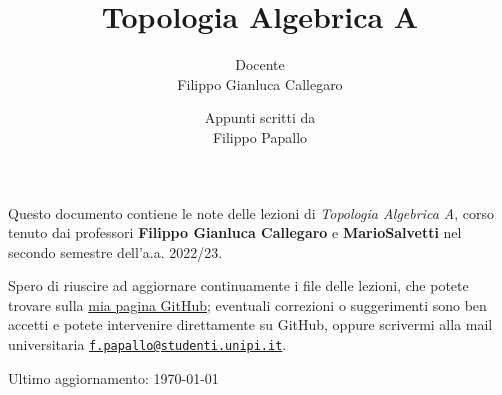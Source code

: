 \documentclass[a4paper, 10pt, oneside, DIV=9, chapterprefix=true, numbers=enddot,bibliography=totoc]{scrbook}
\title{Topologia Algebrica A}
\author{{\normalsize Docente}\\
	Filippo Gianluca Callegaro}
\date{{\normalsize Appunti scritti da}\\
	Filippo Papallo}
\begin{document}
\setlength{\parindent}{0pt}
\setlength{\parskip}{4pt}

\frontmatter
{}
\renewcommand{\thedummy}{\arabic{dummy}}
\maketitle
Questo documento contiene le note delle lezioni di \emph{Topologia Algebrica A},
corso tenuto dai professori \textbf{Filippo Gianluca Callegaro} e
\textbf{MarioSalvetti} nel secondo semestre
dell'a.a. 2022/23. 

Spero di riuscire ad aggiornare continuamente
i file delle lezioni, che potete trovare sulla 
\href{https://github.com/le-pap/Topologia-Algebrica-A}{mia pagina GitHub};
eventuali correzioni o suggerimenti sono ben accetti e potete intervenire direttamente
su GitHub, oppure scrivermi alla mail universitaria 
\href{mailto:f.papallo@studenti.unipi.it}{\texttt{f.papallo@studenti.unipi.it}}.

\hrulefill

Ultimo aggiornamento: \today
	
	
	
\tableofcontents
{}
\setcounter{llecture}{0}
\mainmatter{}
\renewcommand{\thedummy}{\thechapter.\arabic{dummy}}

\renewcommand{\thechapter}{\Roman{chapter}}

	

	

	

	
	
	

	
	
	
	
	
	



%	
%
%	
%
%	
%
%	
%
%	
%
%	





%	

%	

%	

%	

%	


\nocite{*}


\backmatter{}
\printbibliography[heading=bibintoc, title={References}]
\end{document}
